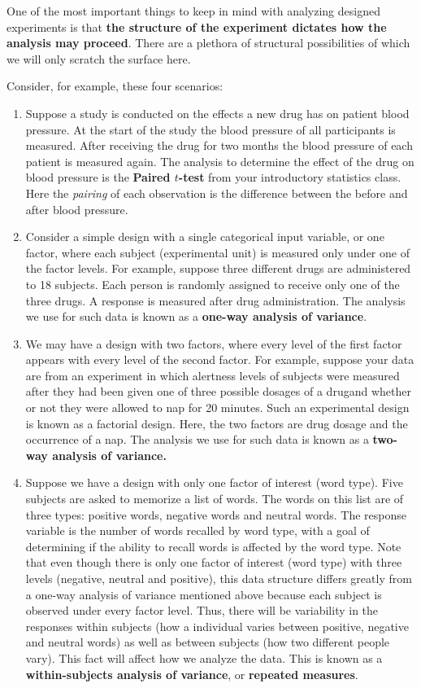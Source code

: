 \documentclass[
]{book}
\begin{document}
One of the most important things to keep in mind with analyzing designed experiments is that \textbf{the structure of the experiment dictates how the analysis may proceed}.
There are a plethora of structural possibilities of which we will only scratch the surface here.

Consider, for example, these four scenarios:

\begin{enumerate}
\def\labelenumi{\arabic{enumi}.}
\item
  Suppose a study is conducted on the effects a new drug has on patient blood pressure. At the start of the study the blood pressure of all participants is measured. After receiving the drug for two months the blood pressure of each patient is measured again. The analysis to determine the effect of the drug on blood pressure is the \textbf{Paired \(t\)-test} from your introductory statistics class. Here the \emph{pairing} of each observation is the difference between the before and after blood pressure.
\item
  Consider a simple design with a single categorical input variable, or one factor, where each subject (experimental unit) is measured only under one of the factor levels. For example, suppose three different drugs are administered to 18 subjects. Each person is randomly assigned to receive only one of the three drugs. A response is measured after drug administration. The analysis we use for such data is known as a \textbf{one-way analysis of variance}.
\item
  We may have a design with two factors, where every level of the first factor appears with every level of the second factor. For example, suppose your data are from an experiment in which alertness levels of subjects were measured after they had been given one of three possible dosages of a drugand whether or not they were allowed to nap for 20 minutes. Such an experimental design is known as a factorial design. Here, the two factors are drug dosage and the occurrence of a nap. The analysis we use for such data is known as a \textbf{two-way analysis of variance.}
\item
  Suppose we have a design with only one factor of interest (word type). Five subjects are asked to memorize a list of words. The words on this list are of three types: positive words, negative words and neutral words. The response variable is the number of words recalled by word type, with a goal of determining if the ability to recall words is affected by the word type. Note that even though there is only one factor of interest (word type) with three levels (negative, neutral and positive), this data structure differs greatly from a one-way analysis of variance mentioned above because each subject is observed under every factor level. Thus, there will be variability in the responses within subjects (how a individual varies between positive, negative and neutral words) as well as between subjects (how two different people vary). This fact will affect how we analyze the data. This is known as a \textbf{within-subjects analysis of variance}, or \textbf{repeated measures}.
\end{enumerate}
\end{document}

